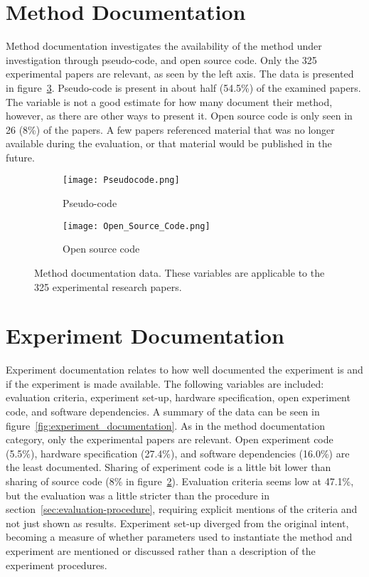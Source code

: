 \section{Method Documentation}
Method documentation investigates the availability of the method under investigation through pseudo-code, and open source code. Only the 325 experimental papers are relevant, as seen by the left axis. The data is presented in figure~\ref{fig:method_documentation}. Pseudo-code is present in about half (54.5\%) of the examined papers. The variable is not a good estimate for how many document their method, however, as there are other ways to present it. Open source code is only seen in 26 (8\%) of the papers. A few papers referenced material that was no longer available during the evaluation, or that material would be published in the future.

\begin{figure}[!htb]
\begin{center}
    \begin{subfigure}[b]{0.4\textwidth}
        \texttt{[image: Pseudocode.png]}
        \caption{Pseudo-code}
        \label{fig:pseudocode}
    \end{subfigure}
    \begin{subfigure}[b]{0.4\textwidth}
        \texttt{[image: Open\_Source\_Code.png]}
        \caption{Open source code}
        \label{fig:open_source_code}
    \end{subfigure}
    \caption[Method documentation data.]{Method documentation data. These variables are applicable to the 325 experimental research papers.}
    \label{fig:method_documentation}
\end{center}
\end{figure}

\section{Experiment Documentation}
Experiment documentation relates to how well documented the experiment is and if the experiment is made available. The following variables are included: evaluation criteria, experiment set-up, hardware specification, open experiment code, and software dependencies. A summary of the data can be seen in figure~\ref{fig:experiment_documentation}. As in the method documentation category, only the experimental papers are relevant. Open experiment code (5.5\%), hardware specification (27.4\%), and software dependencies (16.0\%) are the least documented. Sharing of experiment code is a little bit lower than sharing of source code (8\% in figure~\ref{fig:open_source_code}). Evaluation criteria seems low at 47.1\%, but the evaluation was a little stricter than the procedure in section~\ref{sec:evaluation-procedure}, requiring explicit mentions of the criteria and not just shown as results. Experiment set-up diverged from the original intent, becoming a measure of whether parameters used to instantiate the method and experiment are mentioned or discussed rather than a description of the experiment procedures.

